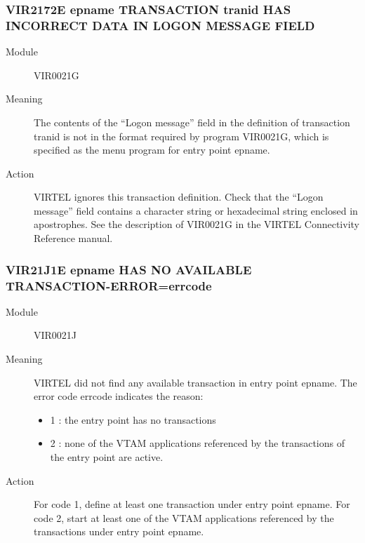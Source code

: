 \documentclass[letterpaper,10pt,english]{sphinxmanual}
\begin{document}
\subsubsection{VIR2172E epname TRANSACTION tranid HAS INCORRECT DATA IN LOGON MESSAGE FIELD}
\label{\detokenize{messages:vir2172e-epname-transaction-tranid-has-incorrect-data-in-logon-message-field}}\begin{description}
\item[{Module}] \leavevmode
VIR0021G

\item[{Meaning}] \leavevmode
The contents of the “Logon message” field in the definition of transaction tranid is not in the format required by program VIR0021G, which is specified as the menu program for entry point epname.

\item[{Action}] \leavevmode
VIRTEL ignores this transaction definition. Check that the “Logon message” field contains a character string or hexadecimal string enclosed in apostrophes. See the description of VIR0021G in the VIRTEL Connectivity Reference manual.

\end{description}


\subsubsection{VIR21J1E epname HAS NO AVAILABLE TRANSACTION-ERROR=errcode}
\label{\detokenize{messages:vir21j1e-epname-has-no-available-transaction-error-errcode}}\begin{description}
\item[{Module}] \leavevmode
VIR0021J

\item[{Meaning}] \leavevmode
VIRTEL did not find any available transaction in entry point epname. The error code errcode indicates the reason:
\begin{itemize}
\item {} 
1 : the entry point has no transactions

\item {} 
2 : none of the VTAM applications referenced by the transactions of the entry point are active.

\end{itemize}

\item[{Action}] \leavevmode
For code 1, define at least one transaction under entry point epname. For code 2, start at least one of the VTAM applications referenced by the transactions under entry point epname.

\end{description}
\end{document}
